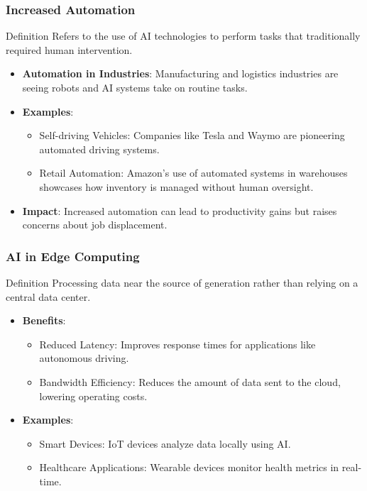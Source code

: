 \documentclass[aspectratio=169]{beamer}
\begin{document}
\begin{frame}[fragile]
    \frametitle{Increased Automation}
    \begin{block}{Definition}
        Refers to the use of AI technologies to perform tasks that traditionally required human intervention.
    \end{block}
    \begin{itemize}
        \item \textbf{Automation in Industries}: Manufacturing and logistics industries are seeing robots and AI systems take on routine tasks.
        \item \textbf{Examples}:
            \begin{itemize}
                \item Self-driving Vehicles: Companies like Tesla and Waymo are pioneering automated driving systems.
                \item Retail Automation: Amazon's use of automated systems in warehouses showcases how inventory is managed without human oversight.
            \end{itemize}
        \item \textbf{Impact}: Increased automation can lead to productivity gains but raises concerns about job displacement.
    \end{itemize}
\end{frame}

\begin{frame}[fragile]
    \frametitle{AI in Edge Computing}
    \begin{block}{Definition}
        Processing data near the source of generation rather than relying on a central data center.
    \end{block}
    \begin{itemize}
        \item \textbf{Benefits}:
            \begin{itemize}
                \item Reduced Latency: Improves response times for applications like autonomous driving.
                \item Bandwidth Efficiency: Reduces the amount of data sent to the cloud, lowering operating costs.
            \end{itemize}
        \item \textbf{Examples}:
            \begin{itemize}
                \item Smart Devices: IoT devices analyze data locally using AI.
                \item Healthcare Applications: Wearable devices monitor health metrics in real-time.
            \end{itemize}
    \end{itemize}
\end{frame}
\end{document}
